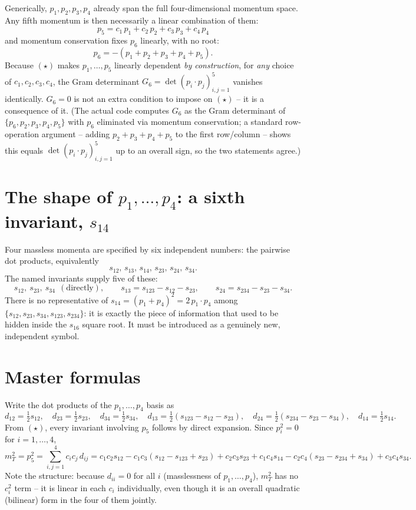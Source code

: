 \documentclass[11pt]{article}
\newcommand{\pp}[2]{p_{#1}\!\cdot\! p_{#2}}
\begin{document}
Generically, $p_1,p_2,p_3,p_4$ already span the full four-dimensional momentum space. Any fifth momentum is then necessarily a linear combination of them:
\[
  \boxed{\;p_5 = c_1\,p_1 + c_2\,p_2 + c_3\,p_3 + c_4\,p_4\;} \tag{$\star$}
\]
and momentum conservation fixes $p_6$ linearly, with no root:
\[
  p_6 = -(p_1+p_2+p_3+p_4+p_5).
\]
Because $(\star)$ makes $p_1,\dots,p_5$ linearly dependent \emph{by construction}, for \emph{any} choice of $c_1,c_2,c_3,c_4$, the Gram determinant $G_6=\det(\pp{i}{j})_{i,j=1}^{5}$ vanishes identically. $G_6=0$ is not an extra condition to impose on $(\star)$ -- it is a consequence of it. (The actual code computes $G_6$ as the Gram determinant of $\{p_6,p_2,p_3,p_4,p_5\}$ with $p_6$ eliminated via momentum conservation; a standard row-operation argument -- adding $p_2+p_3+p_4+p_5$ to the first row/column -- shows this equals $\det(\pp{i}{j})_{i,j=1}^5$ up to an overall sign, so the two statements agree.)

\section{The shape of $p_1,\dots,p_4$: a sixth invariant, $s_{14}$}

Four massless momenta are specified by six independent numbers: the pairwise dot products, equivalently
\[
  s_{12},\,s_{13},\,s_{14},\,s_{23},\,s_{24},\,s_{34}.
\]
The named invariants supply five of these:
\[
  s_{12},\ s_{23},\ s_{34}\ \ (\text{directly}), \qquad
  s_{13}=s_{123}-s_{12}-s_{23}, \qquad s_{24}=s_{234}-s_{23}-s_{34}.
\]
There is no representative of $s_{14}=(p_1+p_4)^2=2\,\pp{1}{4}$ among $\{s_{12},s_{23},s_{34},s_{123},s_{234}\}$: it is exactly the piece of information that used to be hidden inside the $s_{16}$ square root. It must be introduced as a genuinely new, independent symbol.

\section{Master formulas}

Write the dot products of the $p_1,\dots,p_4$ basis as
\[
  d_{12}=\tfrac12 s_{12},\quad d_{23}=\tfrac12 s_{23},\quad d_{34}=\tfrac12 s_{34},\quad
  d_{13}=\tfrac12(s_{123}-s_{12}-s_{23}),\quad d_{24}=\tfrac12(s_{234}-s_{23}-s_{34}),\quad d_{14}=\tfrac12 s_{14}.
\]
From $(\star)$, every invariant involving $p_5$ follows by direct expansion. Since $p_i^2=0$ for $i=1,\dots,4$,
\[
  m_T^2 = p_5^2 = \sum_{i,j=1}^{4} c_i c_j\, d_{ij}
  = c_1c_2 s_{12} - c_1c_3(s_{12}\!-\!s_{123}\!+\!s_{23}) + c_2c_3 s_{23} + c_1c_4 s_{14} - c_2c_4(s_{23}\!-\!s_{234}\!+\!s_{34}) + c_3c_4 s_{34}.
\]
Note the structure: because $d_{ii}=0$ for all $i$ (masslessness of $p_1,\dots,p_4$), $m_T^2$ has no $c_i^2$ term -- it is linear in each $c_i$ individually, even though it is an overall quadratic (bilinear) form in the four of them jointly.
\end{document}
